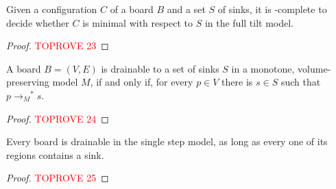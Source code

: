 \documentclass[a4paper,UKenglish,cleveref,thm-restate]{lipics-v2021}
\newcommand{\rOne}[1][M]{\ensuremath{\rightarrow_{#1}}}
\newcommand{\rStar}[1][M]{\rOne[#1]^*}
\begin{document}
\begin{proposition}
    \label{prop:minimality-hard-ft}
    Given a configuration $C$ of a board $B$ and a set $S$ of sinks, it
    is \PSPACE-complete to decide whether $C$ is minimal with respect to $S$ in the
    full tilt model.
\end{proposition}
\begin{proof}\textcolor{red}{TOPROVE 23}\end{proof}

\begin{theorem}\label{drainable_mono_vp}
A board $B=(V,E)$ is drainable to a set of sinks $S$ in a monotone,
volume-preserving model $M$, if and only if, for every $p \in V$ there is \(s \in
S\) such that $p \rStar s$.
\end{theorem}
\begin{proof}\textcolor{red}{TOPROVE 24}\end{proof}

\begin{observation}\label{single_step_trivial}
Every board is drainable in the single step model, as long as every one of its
regions contains a sink.
\end{observation}
\begin{proof}\textcolor{red}{TOPROVE 25}\end{proof}
\end{document}
